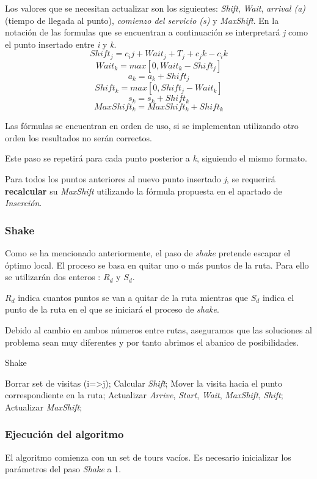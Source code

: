 Los valores que se necesitan actualizar son los siguientes: \textit{Shift}, \textit{Wait}, \textit{arrival (a)} (tiempo de llegada al punto), \textit{comienzo del servicio (s)} y \textit{MaxShift}.
En la notación de las formulas que se encuentran a continuación se interpretará \textit{j} como el punto insertado entre \textit{i} y \textit{k}.
\[Shift_j = c_ij + Wait_j + T_j + c_jk - c_ik\]
\[Wait_k = max[0, Wait_k - Shift_j]\]
\[a_k = a_k + Shift_j\]
\[Shift_k = max[0, Shift_j - Wait_k]\]
\[s_k = s_k + Shift_k\]
\[MaxShift_k = MaxShift_k + Shift_k\]

Las fórmulas se encuentran en orden de uso, si se implementan utilizando otro orden los resultados no serán correctos.

Este paso se repetirá para cada punto posterior a \textit{k}, siguiendo el mismo formato.

Para todos los puntos anteriores al nuevo punto insertado \textit{j}, se requerirá \textbf{recalcular} su \textit{MaxShift} utilizando la fórmula propuesta en el apartado de \textit{Inserción}.
\subsubsection{Shake}
Como se ha mencionado anteriormente, el paso de \textit{shake} pretende escapar el óptimo local.
El proceso se basa en quitar uno o más puntos de la ruta. Para ello se utilizarán dos enteros : $R_d$ y $S_d$.

$R_d$ indica cuantos puntos se van a quitar de la ruta mientras que $S_d$ indica el punto de la ruta en el que se iniciará el proceso de \textit{shake}.

Debido al cambio en ambos números entre rutas, aseguramos que las soluciones al problema sean muy diferentes y por tanto abrimos el abanico de posibilidades.

\begin{algorithm}
\caption{Shake}
\begin{algorithmic}
\STATE Borrar set de visitas (i=>j);
\STATE Calcular \textit{Shift};
\STATE Mover la visita hacia el punto correspondiente en la ruta;
\STATE Actualizar \textit{Arrive}, \textit{Start}, \textit{Wait}, \textit{MaxShift}, \textit{Shift};
\ENDFOR
{}
\STATE Actualizar \textit{MaxShift};
\ENDFOR
\ENDFOR
\end{algorithmic}
\end{algorithm}

\subsubsection{Ejecución del algoritmo}
El algoritmo comienza con un set de tours vacíos.
Es necesario inicializar los parámetros del paso \textit{Shake} a 1.

